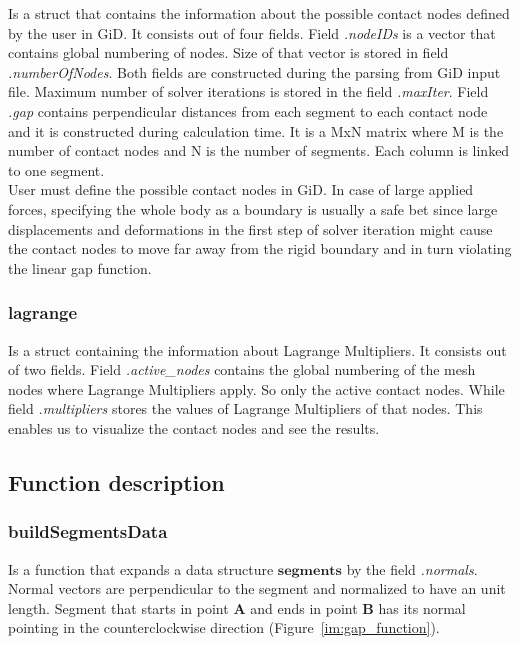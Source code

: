 \documentclass[10pt,a4paper]{article}
\begin{document}
Is a struct that contains the information about the possible contact nodes defined by the user in GiD. It consists out of four fields. Field \textit{.nodeIDs} is a vector that contains global numbering of nodes. Size of that vector is stored in field \textit{.numberOfNodes}. Both fields are constructed during the parsing from GiD input file. Maximum number of solver iterations is stored in the field \textit{.maxIter}. Field \textit{.gap} contains perpendicular distances from each segment to each contact node and it is constructed during calculation time. It is a MxN matrix where M is the number of contact nodes and N is the number of segments. Each column is linked to one segment.\\

User must define the possible contact nodes in GiD. In case of large applied forces, specifying the whole body as a boundary is usually a safe bet since large displacements and deformations in the first step of solver iteration might cause the contact nodes to move far away from the rigid boundary and in turn violating the linear gap function.


\subsubsection{lagrange}

Is a struct containing the information about Lagrange Multipliers. It consists out of two fields. Field \textit{.active\_nodes} contains the global numbering of the mesh nodes where Lagrange Multipliers apply. So only the active contact nodes. While field \textit{.multipliers} stores the values of Lagrange Multipliers of that nodes. This enables us to visualize the contact nodes and see the results.



\subsection{Function description}

\subsubsection{buildSegmentsData}

Is a function that expands a data structure $\textbf{segments}$ by the field \textit{.normals}. Normal vectors are perpendicular to the segment and normalized to have an unit length. Segment that starts in point $\mathbf{A}$ and ends in point $\mathbf{B}$ has its normal pointing in the counterclockwise direction (Figure~\ref{im:gap_function}).
\end{document}
